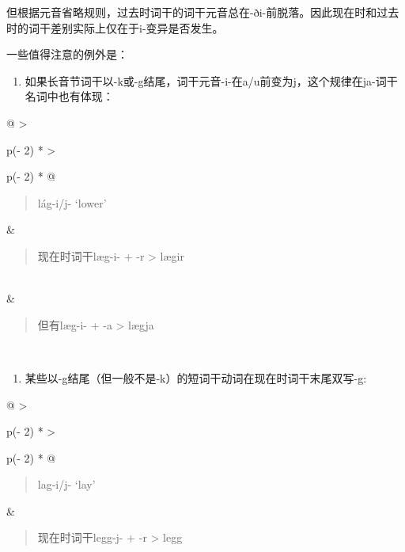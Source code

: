 但根据元音省略规则，过去时词干的词干元音总在-ði-前脱落。因此现在时和过去时的词干差别实际上仅在于i-变异是否发生。

一些值得注意的例外是：

\begin{enumerate}
\def\labelenumi{\arabic{enumi})}
\item
  如果长音节词干以-k或-g结尾，词干元音-i-在a/u前变为j，这个规律在ja-词干名词中也有体现：
\end{enumerate}

\begin{longtable}[]{@{}
  >{\raggedright\arraybackslash}p{(\columnwidth - 2\tabcolsep) * }
  >{\raggedright\arraybackslash}p{(\columnwidth - 2\tabcolsep) * }@{}}
\toprule\noalign{}
\begin{minipage}[b]{\linewidth}\raggedright
\begin{quote}
lág-i/j- `lower‌'
\end{quote}
\end{minipage} & \begin{minipage}[b]{\linewidth}\raggedright
\begin{quote}
现在时词干læg-i- + -r \textgreater{} lægir
\end{quote}
\end{minipage} \\
\midrule\noalign{}
\endhead
\bottomrule\noalign{}
\endlastfoot
& \begin{minipage}[t]{\linewidth}\raggedright
\begin{quote}
但有læg-i- + -a \textgreater{} lægja
\end{quote}
\end{minipage} \\
\end{longtable}

\begin{enumerate}
\def\labelenumi{\arabic{enumi})}
\setcounter{enumi}{1}
\item
  某些以-g结尾（但一般不是-k）的短词干动词在现在时词干末尾双写-g:
\end{enumerate}

\begin{longtable}[]{@{}
  >{\raggedright\arraybackslash}p{(\columnwidth - 2\tabcolsep) * }
  >{\raggedright\arraybackslash}p{(\columnwidth - 2\tabcolsep) * }@{}}
\toprule\noalign{}
\begin{minipage}[b]{\linewidth}\raggedright
\begin{quote}
lag-i/j- `lay‌'
\end{quote}
\end{minipage} & \begin{minipage}[b]{\linewidth}\raggedright
\begin{quote}
现在时词干legg-j- + -r \textgreater{} legg
\end{quote}
\end{minipage} \\
\midrule\noalign{}
\endhead
\bottomrule\noalign{}
\endlastfoot
\end{longtable}

